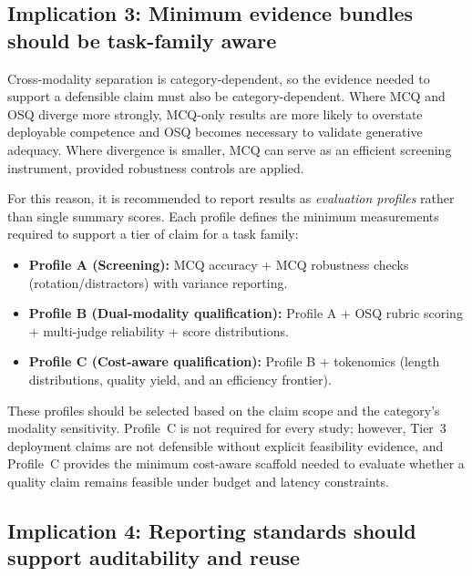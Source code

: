 \subsection{Implication 3: Minimum evidence bundles should be task-family aware}
\label{subsec:ch5_imp_evidence_bundles}

Cross-modality separation is category-dependent, so the evidence needed to support a defensible claim must also be category-dependent. Where MCQ and OSQ diverge more strongly, MCQ-only results are more likely to overstate deployable competence and OSQ becomes necessary to validate generative adequacy. Where divergence is smaller, MCQ can serve as an efficient screening instrument, provided robustness controls are applied.

For this reason, it is recommended to report results as \emph{evaluation profiles} rather than single summary scores. Each profile defines the minimum measurements required to support a tier of claim for a task family:

\begin{itemize}
    \item \textbf{Profile A (Screening):} MCQ accuracy + MCQ robustness checks (rotation/distractors) with variance reporting.
    \item \textbf{Profile B (Dual-modality qualification):} Profile A + OSQ rubric scoring + multi-judge reliability + score distributions.
    \item \textbf{Profile C (Cost-aware qualification):} Profile B + tokenomics (length distributions, quality yield, and an efficiency frontier).

\end{itemize}

These profiles should be selected based on the claim scope and the category's modality sensitivity. Profile~C is not required for every study; however, Tier~3 deployment claims are not defensible without explicit feasibility evidence, and Profile~C provides the minimum cost-aware scaffold needed to evaluate whether a quality claim remains feasible under budget and latency constraints.


\subsection{Implication 4: Reporting standards should support auditability and reuse}
\label{subsec:ch5_imp_reporting_standards}

